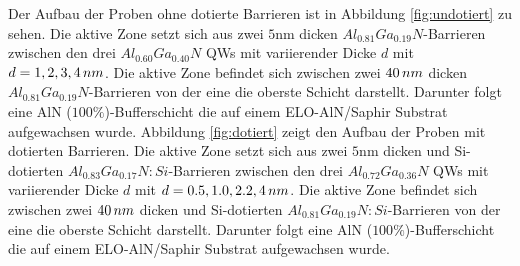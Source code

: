Der Aufbau der Proben ohne dotierte Barrieren ist in Abbildung \ref{fig:undotiert} zu sehen.
Die aktive Zone setzt sich aus zwei $5$nm dicken $ Al_{0.81}Ga_{0.19}N$-Barrieren zwischen den drei $ Al_{0.60}Ga_{0.40}N$ QWs mit variierender Dicke $d$ mit $d=1,2,3,4 \thinspace nm$. Die aktive Zone befindet sich zwischen zwei $40 \thinspace nm$ dicken $ Al_{0.81}Ga_{0.19}N$-Barrieren von der eine die oberste Schicht darstellt. Darunter folgt eine AlN ($100\%$)-Bufferschicht die auf einem ELO-AlN/Saphir Substrat aufgewachsen wurde. 
Abbildung \ref{fig:dotiert} zeigt den Aufbau der Proben mit dotierten Barrieren. Die aktive Zone setzt sich aus zwei $5$nm dicken und Si-dotierten $ Al_{0.83}Ga_{0.17}N:Si$-Barrieren zwischen den drei $ Al_{0.72}Ga_{0.36}N$ QWs mit variierender Dicke $d$ mit $d=0.5,1.0,2.2,4 \thinspace nm$. Die aktive Zone befindet sich zwischen zwei $40 \thinspace nm$ dicken und Si-dotierten $ Al_{0.81}Ga_{0.19}N:Si$-Barrieren von der eine die oberste Schicht darstellt. Darunter folgt eine AlN ($100\%$)-Bufferschicht die auf einem ELO-AlN/Saphir Substrat aufgewachsen wurde. 
%
